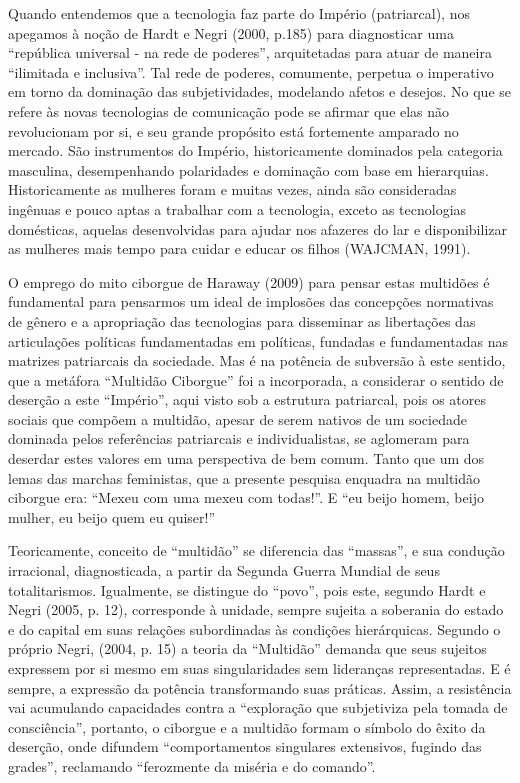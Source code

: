 Quando entendemos que a tecnologia faz parte do Império (patriarcal),
nos apegamos à noção de Hardt e Negri (2000, p.185) para diagnosticar
uma ``república universal - na rede de poderes'', arquitetadas para
atuar de maneira ``ilimitada e inclusiva''. Tal rede de poderes,
comumente, perpetua o imperativo em torno da dominação das
subjetividades, modelando afetos e desejos. No que se refere às novas
tecnologias de comunicação pode se afirmar que elas não revolucionam por
si, e seu grande propósito está fortemente amparado no mercado. São
instrumentos do Império, historicamente dominados pela categoria
masculina, desempenhando polaridades e dominação com base em
hierarquias. Historicamente as mulheres foram e muitas vezes, ainda são
consideradas ingênuas e pouco aptas a trabalhar com a tecnologia, exceto
as tecnologias domésticas, aquelas desenvolvidas para ajudar nos
afazeres do lar e disponibilizar as mulheres mais tempo para cuidar e
educar os filhos (WAJCMAN, 1991).

O emprego do mito ciborgue de Haraway (2009) para pensar estas multidões
é fundamental para pensarmos um ideal de implosões das concepções
normativas de gênero e a apropriação das tecnologias para disseminar as
libertações das articulações políticas fundamentadas em políticas,
fundadas e fundamentadas nas matrizes patriarcais da sociedade. Mas é na
potência de subversão à este sentido, que a metáfora ``Multidão
Ciborgue'' foi a incorporada, a considerar o sentido de deserção a este
``Império'', aqui visto sob a estrutura patriarcal, pois os atores
sociais que compõem a multidão, apesar de serem nativos de um sociedade
dominada pelos referências patriarcais e individualistas, se aglomeram
para deserdar estes valores em uma perspectiva de bem comum. Tanto que
um dos lemas das marchas feministas, que a presente pesquisa enquadra na
multidão ciborgue era: ``Mexeu com uma mexeu com todas!''. E ``eu beijo
homem, beijo mulher, eu beijo quem eu quiser!''

Teoricamente, conceito de ``multidão'' se diferencia das ``massas'', e
sua condução irracional, diagnosticada, a partir da Segunda Guerra
Mundial de seus totalitarismos. Igualmente, se distingue do ``povo'',
pois este, segundo Hardt e Negri (2005, p. 12), corresponde à unidade,
sempre sujeita a soberania do estado e do capital em suas relações
subordinadas às condições hierárquicas. Segundo o próprio Negri, (2004,
p. 15) a teoria da ``Multidão'' demanda que seus sujeitos expressem por
si mesmo em suas singularidades sem lideranças representadas. E é
sempre, a expressão da potência transformando suas práticas. Assim, a
resistência vai acumulando capacidades contra a ``exploração que
subjetiviza pela tomada de consciência'', portanto, o ciborgue e a
multidão formam o símbolo do êxito da deserção, onde difundem
``comportamentos singulares extensivos, fugindo das grades'', reclamando
``ferozmente da miséria e do comando''.

